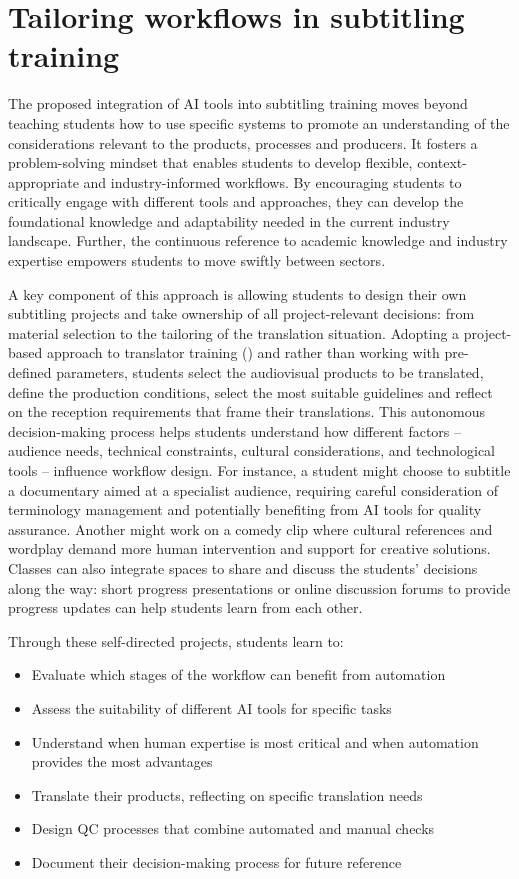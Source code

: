 \documentclass[output=paper]{langscibook}
\begin{document}
\section{Tailoring workflows in subtitling training}

The proposed integration of AI tools into subtitling training moves beyond teaching students how to use specific systems to promote an understanding of the considerations relevant to the products, processes and producers. It fosters a problem-solving mindset that enables students to develop flexible, context-appropriate and industry-informed workflows. By encouraging students to critically engage with different tools and approaches, they can develop the foundational knowledge and adaptability needed in the current industry landscape. Further, the continuous reference to academic knowledge and industry expertise empowers students to move swiftly between sectors.

\newpage
A key component of this approach is allowing students to design their own subtitling projects and take ownership of all project-relevant decisions: from material selection to the tailoring of the translation situation. Adopting a project-based approach to translator training (\citealt{kiraly2006project-based, mitchellschuite20}) and rather than working with pre-defined parameters, students select the audiovisual products to be translated, define the production conditions, select the most suitable guidelines and reflect on the reception requirements that frame their translations. This autonomous decision-making process helps students understand how different factors -- audience needs, technical constraints, cultural considerations, and technological tools -- influence workflow design. For instance, a student might choose to subtitle a documentary aimed at a specialist audience, requiring careful consideration of terminology management and potentially benefiting from AI tools for quality assurance. Another might work on a comedy clip where cultural references and wordplay demand more human intervention and support for creative solutions. Classes can also integrate spaces to share and discuss the students’ decisions along the way: short progress presentations or online discussion forums to provide progress updates can help students learn from each other.

Through these self-directed projects, students learn to:

\begin{itemize}
\item Evaluate which stages of the workflow can benefit from automation
\item Assess the suitability of different AI tools for specific tasks
\item Understand when human expertise is most critical and when automation provides the most advantages
\item Translate their products, reflecting on specific translation needs
\item Design QC processes that combine automated and manual checks
\item Document their decision-making process for future reference
\end{itemize}
\end{document}
